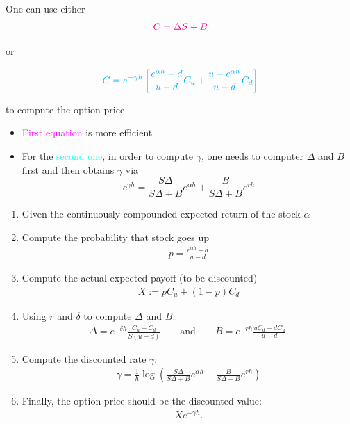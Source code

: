 \begin{frame}[fragile,t]
	\begin{center}
		One can use either
		\bigskip
		\begin{equation*}
			\textcolor{magenta}{C= \Delta S + B}
		\end{equation*}

		\bigskip
		or
		\bigskip

		\begin{equation*}
			\textcolor{cyan}{C = e^{-\gamma h} \left[ \frac{e^{\alpha h}-d}{u-d}C_u+ \frac{u- e^{\alpha h}}{u-d}C_d\right]}
		\end{equation*}
		\bigskip

		to compute the option price
	\end{center}
	\pause
	\mySeparateLine
	\begin{itemize}
		\item \textcolor{magenta}{First equation} is more efficient
		\item For the \textcolor{cyan}{second one}, in order to compute $\gamma$, one needs to computer  $\Delta$ and  $B$
			first and then obtains $\gamma$ via
			\begin{equation*}
					e^{\gamma h} = \frac{S \Delta}{S \Delta +B} e^{\alpha h} + \frac{B}{S\Delta +B}e^{r h}
			\end{equation*}
	\end{itemize}
\end{frame}
\begin{frame}[fragile,t]
\begin{enumerate}
	\item[] Given the continuously compounded expected return of the stock $\alpha$
		\bigskip
	\item Compute the probability that stock goes up
		\begin{align*}
			p=\frac{e^{\alpha h}-d}{u-d}
		\end{align*}
	\item Compute the actual expected payoff (to be discounted)
		\begin{align*}
			X := p C_u + (1-p) C_d
		\end{align*}
	\item Using $r$ and $\delta$ to compute  $\Delta$ and $B$:
		\begin{align*}
			\Delta = e^{-\delta h}\frac{C_u-C_d}{S(u-d)} \qquad \text{and} \qquad
			B=e^{-rh}\frac{uC_d-dC_u}{u-d}.
		\end{align*}
	\item Compute the discounted rate $\gamma$:
		\begin{align*}
			\gamma = \frac{1}{h}\log\left(\frac{S\Delta}{S\Delta+B}e^{\alpha h} + \frac{B}{S\Delta+B}e^{r h}\right)
		\end{align*}
	\item Finally, the option price should be the discounted value:
		\begin{align*}
			X e^{-\gamma h}.
		\end{align*}
\end{enumerate}
\end{frame}
